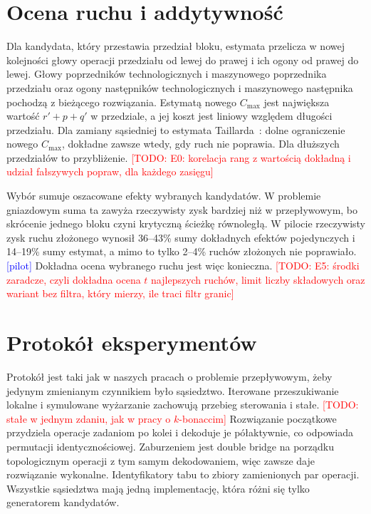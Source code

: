 \documentclass[10pt,twocolumn]{article}
\newcommand{\todo}[1]{\textcolor{red}{[TODO: #1]}}
\newcommand{\pilot}{\textcolor{blue}{[pilot]}}
\newcommand{\Cmax}{C_{\max}}
\begin{document}
\section{Ocena ruchu i addytywność}\label{sec:eval}

Dla kandydata, który przestawia przedział bloku, estymata przelicza
w nowej kolejności głowy operacji przedziału od lewej do prawej i ich
ogony od prawej do lewej. Głowy poprzedników technologicznych
i maszynowego poprzednika przedziału oraz ogony następników
technologicznych i maszynowego następnika pochodzą z bieżącego
rozwiązania. Estymatą nowego $\Cmax$ jest największa wartość $r'+p+q'$
w przedziale, a jej koszt jest liniowy względem długości przedziału. Dla
zamiany sąsiedniej to estymata Taillarda~\cite{taillard1994}: dolne
ograniczenie nowego $\Cmax$, dokładne zawsze wtedy, gdy ruch nie
poprawia. Dla dłuższych przedziałów to przybliżenie. \todo{E0: korelacja
rang z wartością dokładną i udział fałszywych popraw, dla każdego
zasięgu}

Wybór sumuje oszacowane efekty wybranych kandydatów. W problemie
gniazdowym suma ta zawyża rzeczywisty zysk bardziej niż w przepływowym,
bo skrócenie jednego bloku czyni krytyczną ścieżkę równoległą. W pilocie
rzeczywisty zysk ruchu złożonego wynosił 36--43\% sumy dokładnych efektów
pojedynczych i 14--19\% sumy estymat, a mimo to tylko 2--4\% ruchów
złożonych nie poprawiało. \pilot{} Dokładna ocena wybranego ruchu jest
więc konieczna. \todo{E5: środki zaradcze, czyli dokładna ocena $t$
najlepszych ruchów, limit liczby składowych oraz wariant bez filtra, który
mierzy, ile traci filtr granic}

\section{Protokół eksperymentów}\label{sec:setup}

Protokół jest taki jak w naszych pracach o problemie przepływowym, żeby
jedynym zmienianym czynnikiem było sąsiedztwo. Iterowane przeszukiwanie
lokalne i symulowane wyżarzanie zachowują przebieg sterowania i stałe.
\todo{stałe w jednym zdaniu, jak w pracy o $k$-bonaccim} Rozwiązanie
początkowe przydziela operacje zadaniom po kolei i dekoduje je
półaktywnie, co odpowiada permutacji identycznościowej. Zaburzeniem jest
double bridge na porządku topologicznym operacji z tym samym
dekodowaniem, więc zawsze daje rozwiązanie wykonalne. Identyfikatory tabu
to zbiory zamienionych par operacji. Wszystkie sąsiedztwa mają jedną
implementację, która różni się tylko generatorem kandydatów.
\end{document}
